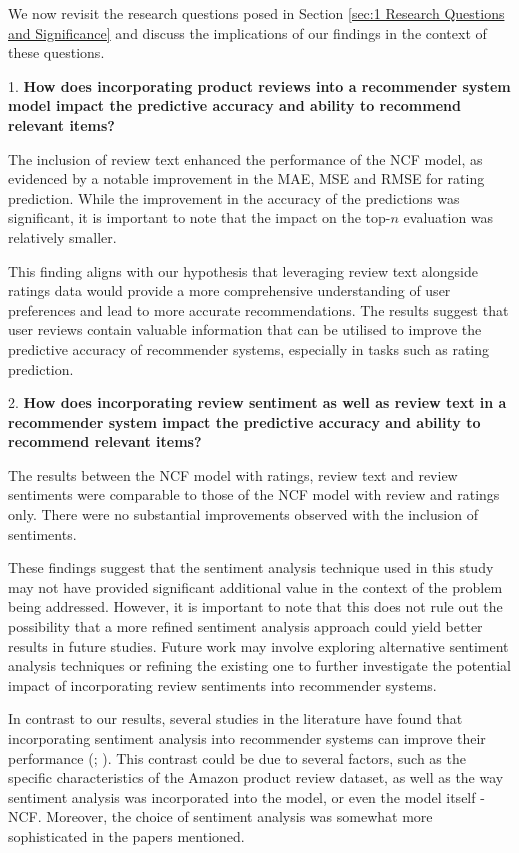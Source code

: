 We now revisit the research questions posed in Section \ref{sec:1 Research Questions and Significance} and discuss the implications of our findings in the context of these questions.



1. \textbf{How does incorporating product reviews into a recommender system model impact the predictive accuracy and ability to recommend relevant items?} 

The inclusion of review text enhanced the performance of the NCF model, as evidenced by a notable improvement in the MAE, MSE and RMSE for rating prediction. While the improvement in the accuracy of the predictions was significant, it is important to note that the impact on the top-$n$ evaluation was relatively smaller. 

This finding aligns with our hypothesis that leveraging review text alongside ratings data would provide a more comprehensive understanding of user preferences and lead to more accurate recommendations. The results suggest that user reviews contain valuable information that can be utilised to improve the predictive accuracy of recommender systems, especially in tasks such as rating prediction.

2. \textbf{How does incorporating review sentiment as well as review text in a recommender system impact the predictive accuracy and ability to recommend relevant items?}

The results between the NCF model with ratings, review text and review sentiments were comparable to those of the NCF model with review and ratings only. There were no substantial improvements observed with the inclusion of sentiments.

These findings suggest that the sentiment analysis technique used in this study may not have provided significant additional value in the context of the problem being addressed. However, it is important to note that this does not rule out the possibility that a more refined sentiment analysis approach could yield better results in future studies. Future work may involve exploring alternative sentiment analysis techniques or refining the existing one to further investigate the potential impact of incorporating review sentiments into recommender systems. 

In contrast to our results, several studies in the literature have found that incorporating sentiment analysis into recommender systems can improve their performance (\cite{srifi2020recommender}; \cite{roy2022systematic}). This contrast could be due to several factors, such as the specific characteristics of the Amazon product review dataset, as well as the way sentiment analysis was incorporated into the model, or even the model itself - NCF. Moreover, the choice of sentiment analysis was somewhat more sophisticated in the papers mentioned.


